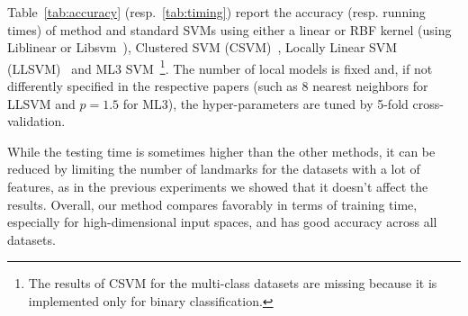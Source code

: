\begin{table*}[h!]
    \centering
    \caption{Training and Testing times (in seconds).}
    \label{tab:timing}
\end{table*}

Table~\ref{tab:accuracy} (resp.~\ref{tab:timing}) report the accuracy (resp. running times) of  \landSVM method and standard SVMs using either a linear or RBF kernel (using Liblinear or Libsvm~\cite{chang2011libsvm}), Clustered SVM (CSVM)~\cite{gu2013clustered}, Locally Linear SVM (LLSVM)~\cite{ladicky2011locally} and ML3 SVM~\cite{fornoni2013multiclass}\footnote{The results of CSVM for the multi-class datasets are missing because it is implemented only for binary classification.}. The number of local models is fixed and, if not differently specified in the respective papers (such as 8 nearest neighbors for LLSVM and $p=1.5$ for ML3), the hyper-parameters are tuned by 5-fold cross-validation.

While the testing time is sometimes higher than the other methods, it can be reduced by limiting the number of landmarks for the datasets with a lot of features, as in the previous experiments we showed that it doesn't affect the results. 
Overall, our method compares favorably in terms of training time, especially for high-dimensional input spaces, and has good accuracy across all datasets.
